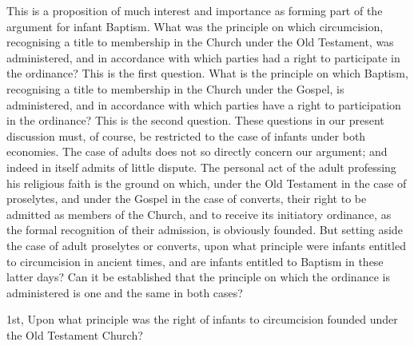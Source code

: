\documentclass[]{book}
\begin{document}
This is a proposition of much interest and importance as forming part of the argument for infant Baptism. What was the principle on which circumcision, recognising a title to membership in the Church under the Old Testament, was administered, and in accordance with which parties had a right to participate in the ordinance? This is the first question. What is the principle on which Baptism, recognising a title to membership in the Church under the Gospel, is administered, and in accordance with which parties have a right to participation in the ordinance? This is the second question. These questions in our present discussion must, of course, be restricted to the case of infants under both economies. The case of adults does not so directly concern our argument; and indeed in itself admits of little dispute. The personal act of the adult professing his religious faith is the ground on which, under the Old Testament in the case of proselytes, and under the Gospel in the case of converts, their right to be admitted as members of the Church, and to receive its initiatory ordinance, as the formal recognition of their admission, is obviously founded. But setting aside the case of adult proselytes or converts, upon what principle were infants entitled to circumcision in ancient times, and are infants entitled to Baptism in these latter days? Can it be established that the principle on which the ordinance is administered is one and the same in both cases?

1st, Upon what principle was the right of infants to circumcision founded under the Old Testament Church?
\end{document}
